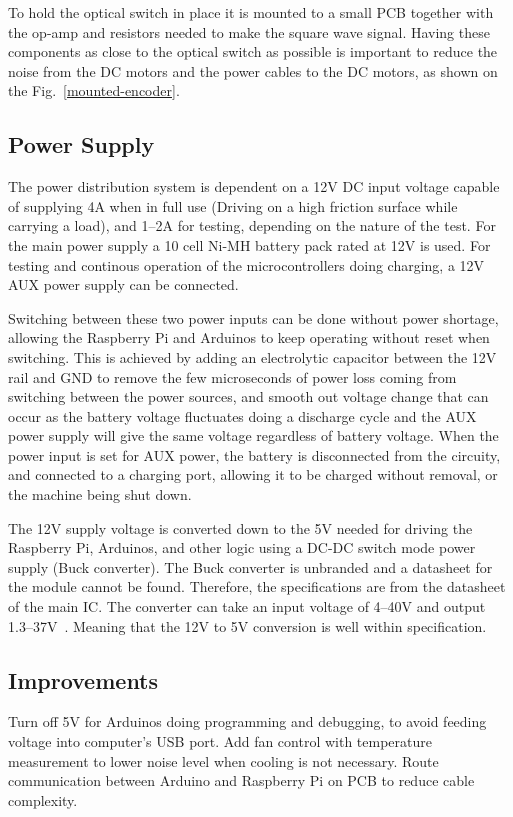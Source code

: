 \documentclass[11pt]{article}
\begin{document}
To hold the optical switch in place it is mounted to a small PCB together with the op-amp and resistors needed to make the square wave signal. Having these components as close to the optical switch as possible is important to reduce the noise from the DC motors and the power cables to the DC motors, as shown on the Fig.~\ref{mounted-encoder}.
\subsection*{Power Supply}


The power distribution system is dependent on a 12V DC input voltage capable of supplying 4A when in full use (Driving on a high friction surface while carrying a load), and 1--2A for testing, depending on the nature of the test. For the main power supply a 10 cell Ni-MH battery pack rated at 12V is used. For testing and continous operation of the microcontrollers doing charging, a 12V AUX power supply can be connected.


Switching between these two power inputs can be done without power shortage, allowing the Raspberry Pi and Arduinos to keep operating without reset when switching. This is achieved by adding an electrolytic capacitor between the 12V rail and GND to remove the few microseconds of power loss coming from switching between the power sources, and smooth out voltage change that can occur as the battery voltage fluctuates doing a discharge cycle and the AUX power supply will give the same voltage regardless of battery voltage. When the power input is set for AUX power, the battery is disconnected from the circuity, and connected to a charging port, allowing it to be charged without removal, or the machine being shut down.


The 12V supply voltage is converted down to the 5V needed for driving the Raspberry Pi, Arduinos, and other logic using a DC-DC switch mode power supply (Buck converter). The Buck converter is unbranded and a datasheet for the module cannot be found. Therefore, the specifications are from the datasheet of the main IC. The converter can take an input voltage of 4--40V and output 1.3--37V~\cite{LM2596-datasheet}. Meaning that the 12V to 5V conversion is well within specification. 

\subsection*{Improvements}


Turn off 5V for Arduinos doing programming and debugging, to avoid feeding voltage into computer's USB port. Add fan control with temperature measurement to lower noise level when cooling is not necessary. Route communication between Arduino and Raspberry Pi on PCB to reduce cable complexity.
\end{document}
